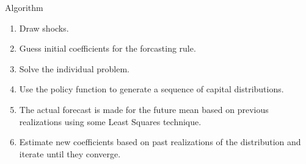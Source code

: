 \documentclass{beamer}
\begin{document}
\begin{frame}{Algorithm}
  \begin{enumerate}

  \item {
  Draw shocks.
  }

  \item {
  Guess initial coefficients for the forcasting rule.  
  }
  
  \item {
  Solve the individual problem.
  }

  \item {
  Use the policy function to generate a sequence of capital distributions.
  }

  \item {
  The actual forecast is made for the future mean based on previous realizations using some Least Squares technique.
  }

  \item {
  Estimate new coefficients based on past realizations of the distribution and iterate until they converge. 
  }
 

  \end{enumerate}

\end{frame}
\end{document}
